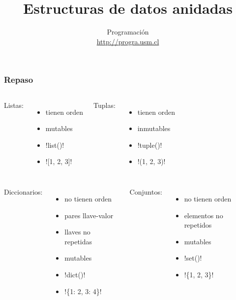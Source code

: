 \documentclass[12pt]{beamer}
\title{Estructuras de datos anidadas}
\author{
  Programación \\ \url{http://progra.usm.cl}
}
\date{}
\begin{document}
  \begin{frame}
    \maketitle
  \end{frame}

  \begin{frame}
    \label{repaso}
    \frametitle{Repaso}
    \small
    \def\sep{-1ex}
    \begin{columns}[T]
        Listas:
        \begin{itemize}
          \setlength{\itemsep}{\sep}
          \item tienen orden
          \item mutables
          \item \li!list()!
          \item \li![1, 2, 3]!
        \end{itemize}
        Tuplas:
        \begin{itemize}
          \setlength{\itemsep}{\sep}
          \item tienen orden
          \item inmutables
          \item \li!tuple()!
          \item \li!(1, 2, 3)!
        \end{itemize}
    \end{columns}
    \vfill
    \begin{columns}[T]
        Diccionarios:
        \begin{itemize}
          \setlength{\itemsep}{\sep}
          \item no tienen orden
          \item pares llave-valor
          \item llaves no repetidas
          \item mutables
          \item \li!dict()!
          \item \li!\{1: 2, 3: 4\}!
        \end{itemize}
        Conjuntos:
        \begin{itemize}
          \setlength{\itemsep}{\sep}
          \item no tienen orden
          \item elementos no repetidos
          \item mutables
          \item \li!set()!
          \item \li!\{1, 2, 3\}!
        \end{itemize}
    \end{columns}
  \end{frame}
\end{document}
